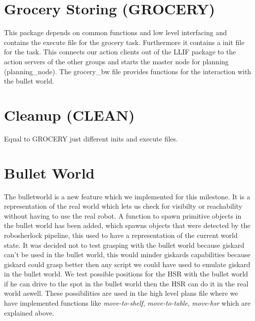 \documentclass[main.tex]{subfiles}
\begin{document}
                \section{Grocery Storing (GROCERY)}
                This package depends on common functions and low level interfacing and contains the execute file for the grocery task. Furthermore it contains a init file for the task. This connects our action clients out of the LLIF package to the action servers of the other groups and starts the master node for planning (planning\_node). The grocery\_bw file provides functions for the interaction with the bullet world.
                
                \section{Cleanup (CLEAN)}
                Equal to GROCERY just different inits and execute files.
                \section{Bullet World}
	                The bulletworld is a new feature which we implemented for this milestone. It is a representation of the real world which lets us check for visibilty or reachability without having to use the real robot. A function to spawn primitive objects in the bullet world has been added, which spawns objects that were detected by the robosherlock pipeline, this used to have a representation of the current world state. It was decided not to test grasping with the bullet world because giskard can't be used in the bullet world, this would minder giskards capabilities because giskard could grasp better then any script we could have used to emulate giskard in the bullet world. We test possible positions for the HSR with the bullet world if he can drive to the spot in the bullet world then the HSR can do it in the real world aswell. These possibilities are used in the high level plans file where we have implemented functions like \textit{move-to-shelf}, \textit{move-to-table}, \textit{move-hsr} which are explained above.
                
\end{document}
